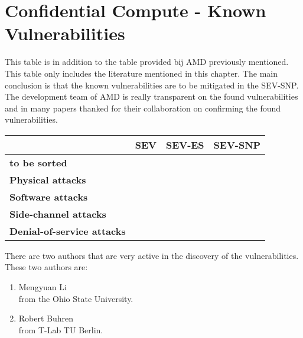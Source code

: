 
\section*{Confidential Compute - Known Vulnerabilities}


This table is in addition to the table provided bij AMD previously mentioned.
This table only includes the literature mentioned in this chapter. 
The main conclusion is that the known vulnerabilities 
are to be mitigated in the SEV-SNP. 
The development team of AMD is really transparent on the found vulnerabilities 
and in many papers thanked for their collaboration 
on confirming the found vulnerabilities. 

\begin{tabular}{ |l|c|c|c| }
   & \textbf{SEV} & \textbf{SEV-ES} & \textbf{SEV-SNP}\\
  \hline

  \textbf{to be sorted} 
  & \cite{hetzelt_security_2017,du_secure_2017,li_tlb_2021}
  & \cite{li_tlb_2021} 
  & \\

  \textbf{Physical attacks} 
  & \cite{li_exploiting_2019,buhren_insecure_2019,buhren_one_2021} 
  & \cite{wilke_sevurity_2020,buhren_one_2021} 
  & \cite{buhren_one_2021}\\

  \textbf{Software attacks} 
  & \cite{morbitzer_severed_2018,hetzelt_via_2021}
  & \cite{hetzelt_via_2021} 
  & \\

  \textbf{Side-channel attacks} 
  & \cite{li_crossline_2021,li_cipherleaks_2021,mestas_exploitation_2021} 
  & \cite{li_crossline_2021,li_cipherleaks_2021,mestas_exploitation_2021} 
  & \\

  \textbf{Denial-of-service attacks} & & & \\

\end{tabular}

There are two authors that are very active in the discovery of the vulnerabilities. 
These two authors are: 
\begin{enumerate}
  \item Mengyuan Li \\
  from the Ohio State University.  
  \item Robert Buhren \\
  from T-Lab TU  Berlin.
\end{enumerate}

